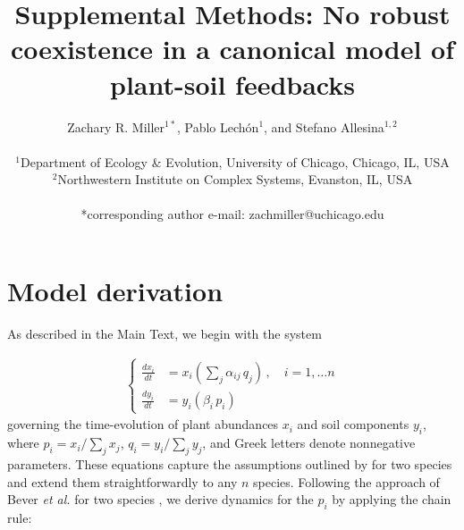 \documentclass[11pt]{article}
\title{Supplemental Methods: No robust coexistence in a canonical model of plant-soil feedbacks}
\date{}
\author{Zachary R. Miller$^{1*}$, Pablo Lech\'{o}n$^{1}$, and Stefano Allesina$^{1,2}$ \\
	\\
	\normalsize{$^{1}$Department of Ecology \& Evolution, University of Chicago, Chicago, IL, USA}\\
	\normalsize{$^{2}$Northwestern Institute on Complex Systems, Evanston, IL, USA}\\
	\\
	\normalsize{*corresponding author e-mail: zachmiller@uchicago.edu}\\
}
\begin{document}
\maketitle
{}
\linenumbers

\section{Model derivation}

As described in the Main Text, we begin with the system

\begin{align}
\begin{cases}
\frac{dx_i}{dt} &= x_i \left(\sum_{j} \alpha_{ij} \, q_j \right) \, , \quad  i = 1, \dots n \\
\frac{dy_i}{dt} &= y_i \left( \beta_i \, p_i \right)
\end{cases}
\end{align}
governing the time-evolution of plant abundances $x_i$ and soil components $y_i$, where $p_i = x_i / \sum_j x_j$, $q_i = y_i / \sum_j y_j$, and Greek letters denote nonnegative parameters. These equations capture the assumptions outlined by \citet{bever1997incorporating} for two species and extend them straightforwardly to any $n$ species. Following the approach of Bever \textit{et al.} for two species \citep[and consistent with other generalizations of this model,][]{kulmatiski2008plant,eppinga2018frequency}, we derive dynamics for the $p_i$ by applying the chain rule:
\end{document}
